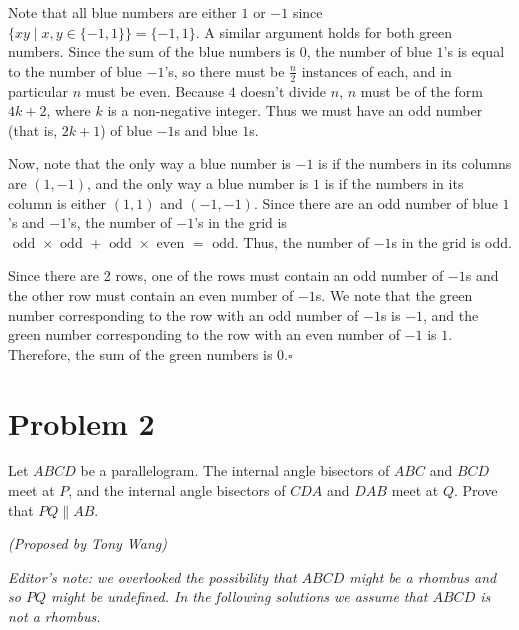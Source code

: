 \documentclass[10pt]{article}
\begin{document}
	\noindent Note that all blue numbers are either \(1\) or \(-1\) since \(\{xy \mid x, y \in \{-1, 1\}\} = \{-1, 1\}\). A similar argument holds for both green numbers. Since the sum of the blue numbers is \(0\), the number of blue \(1\)'s is equal to the number of blue \(-1\)'s, so there must be \(\frac{n}{2}\) instances of each, and in particular \(n\) must be even. Because \(4\) doesn't divide \(n\), \(n\) must be of the form \(4k + 2\), where \(k\) is a non-negative integer. Thus we must have an odd number (that is, \(2k+1\)) of blue \(-1\)s and blue \(1\)s.
	
	Now, note that the only way a blue number is \(-1\) is if the numbers in its columns are \((1, -1)\), and the only way a blue number is \(1\) is if the numbers in its column is either \((1, 1)\) and \((-1, -1)\). Since there are an odd number of blue \(1\)'s and \(-1\)'s, the number of \(-1\)'s in the grid is \(\text{ odd } \times \text{ odd } + \text{ odd } \times \text{ even } = \text{ odd}\). Thus, the number of \(-1\)s in the grid is odd.
	
	Since there are 2 rows, one of the rows must contain an odd number of \(-1\)s and the other row must contain an even number of \(-1\)s. We note that the green number corresponding to the row with an odd number of \(-1\)s is \(-1\), and the green number corresponding to the row with an even number of \(-1\) is \(1\). Therefore, the sum of the green numbers is \(0\).\hfill\ensuremath{\square}\\
	
	\newpage
	
	\section*{Problem 2}
	
	Let \(ABCD\) be a parallelogram. The internal angle bisectors of \(ABC\) and \(BCD\) meet at \(P\), and the internal angle bisectors of \(CDA\) and \(DAB\) meet at \(Q\). Prove that \(PQ \parallel AB\).
	\begin{flushright}
	\textit{(Proposed by Tony Wang)}
	\end{flushright}
	
	\noindent \textit{Editor's note: we overlooked the possibility that \(ABCD\) might be a rhombus and so \(PQ\) might be undefined. In the following solutions we assume that \(ABCD\) is not a rhombus.}\\
	
		\noindent \makebox[\linewidth]{\rule{\textwidth}{0.4pt}}
	
\end{document}
